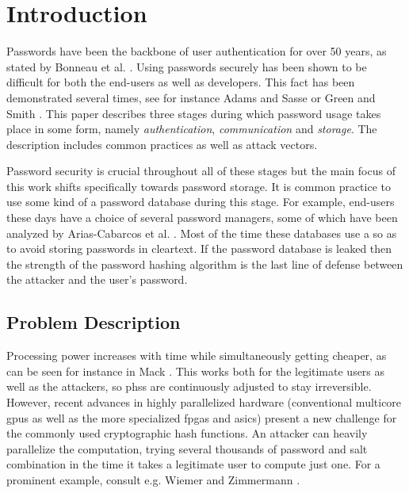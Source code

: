 \chapter{Introduction}
\label{sec:introduction}
Passwords have been the backbone of user authentication for over 50 years, as stated by Bonneau et al. \cite{bonneau:2015:passwords-and-evolution-of-auth}. Using passwords securely has been shown to be difficult for both the end-users as well as developers. This fact has been demonstrated several times, see for instance Adams and Sasse \cite{adams:1999:users-are-not-the-enemy} or Green and Smith \cite{green:2016:developers-are-not-the-enemy}. This paper describes three stages during which password usage takes place in some form, namely \emph{authentication}, \emph{communication} and \emph{storage}. The description includes common practices as well as attack vectors.

Password security is crucial throughout all of these stages but the main focus of this work shifts specifically towards password storage. It is common practice to use some kind of a password database during this stage. For example, end-users these days have a choice of several password managers, some of which have been analyzed by Arias-Cabarcos et al. \cite{arias:2016:comparing}. Most of the time these databases use a  so as to avoid storing passwords in cleartext. If the password database is leaked then the strength of the password hashing algorithm is the last line of defense between the attacker and the user's password.

\section{Problem Description}
Processing power increases with time while simultaneously getting cheaper, as can be seen for instance in Mack \cite{mack:2015:the-multiple-lives-of-moores-law}. This works both for the legitimate users as well as the attackers, so \glspl{phs} are continuously adjusted to stay irreversible. However, recent advances in highly parallelized hardware (conventional multicore \glspl{gpu} as well as the more specialized \glspl{fpga} and \glspl{asic}) present a new challenge for the commonly used cryptographic hash functions. An attacker can heavily parallelize the computation, trying several thousands of password and salt combination in the time it takes a legitimate user to compute just one. For a prominent example, consult e.g. Wiemer and Zimmermann \cite{wiemer:2014:high-speed-bcrypt}.

